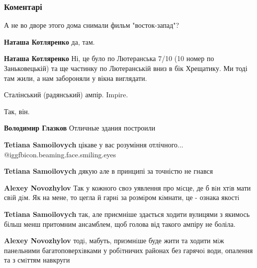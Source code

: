  
 
 
 
 
\subsubsection{Коментарі}
\label{sec:09_10_2021.fb.fb_group.story_kiev_ua.1.zanjkoveckoj_8.cmt}

\begin{itemize} %
А не во дворе этого дома снимали фильм "восток-запад"?

\begin{itemize} %
\textbf{Наташа Котляренко} да, там.

\textbf{Наташа Котляренко} Ні, це було по Лютеранська 7/10 (10 номер по Заньковецькій) та ще частинку по Лютеранській вниз в бік Хрещатику. Ми тоді там жили, а нам забороняли у вікна виглядати.
\end{itemize} %

Сталінський (радянський) ампір.
Impire.

\begin{itemize} %
Так, він.

\textbf{Володимир Глазков} Отличные здания построили

\begin{itemize} %
\textbf{Tetiana Samoilovych} цікаве у вас розуміння отлічного... @igg{fbicon.beaming.face.smiling.eyes} 

\textbf{Tetiana Samoilovych} дякую але в принципі за точністю не гнався

\textbf{Alexey Novozhylov} Так у кожного своэ уявлення про мiсце, де б вiн хтiв мати свiй дiм. Як на мене, то цегла й гарнi за розмiром кiмнати, це - ознака якостi

\textbf{Tetiana Samoilovych} так, але приємніше здається ходити вулицями з якимось більш менш притомним ансамблем, щоб голова від такого ампіру не боліла.

\textbf{Alexey Novozhylov} тодi, мабуть, приэмнiше буде жити та ходити мiж панельними багатоповерхiвками у робiтничих районах без гарячоi води, опалення та з смiттям навкруги


\end{itemize}
\end{itemize}
\end{itemize}
